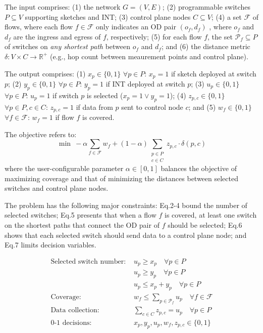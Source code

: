  The input comprises:
(1) the network $G = (V, E)$;
(2) programmable switches $P \subseteq V$ supporting sketches and INT;
(3) control plane nodes $C \subseteq V$;
(4) a set $\mathcal{F}$ of flows, where each flow $f \in \mathcal{F}$ only indicates an OD pair $(o_f, d_f)$ \cite{liu2016one,anup2022hetero}, where $o_f$ and $d_f$ are the ingress and egress of $f$, respectively; 
(5) for each flow $f$, the set $\mathcal{P}_f \subseteq P$ of switches on \emph{any shortest path} between $o_f$ and $d_f$;
and (6) the distance metric $\delta: V \times C \to \mathbb{R}^+$ (e.g., hop count between meaurement points and control plane).

 The output comprises:
(1) $x_p \in \{0,1\}$ $\forall p \in P$: $x_p=1$ if sketch deployed at switch $p$;
(2) $y_p \in \{0,1\}$ $\forall p \in P$: $y_p=1$ if INT deployed at switch $p$;
(3) $u_p \in \{0,1\}$ $\forall p \in P$: $u_p=1$ if switch $p$ is selected ($x_p =1 \lor y_p=1$);
(4) $z_{p,c} \in \{0,1\}$ $\forall p \in P, c \in C$: $z_{p,c}=1$ if data from $p$ sent to control node $c$;
and (5) $w_f \in \{0,1\}$ $\forall f \in \mathcal{F}$: $w_f=1$ if flow $f$ is covered.

 The objective refers to:
\begin{equation}
\min\ -\alpha \sum_{f \in \mathcal{F}} w_f + (1-\alpha) \sum_{\substack{p \in P \\ c \in C}} z_{p,c} \cdot \delta(p, c)
\label{eq:objective}
\end{equation}
where the user-configurable parameter $\alpha \in [0,1]$ balances the objective of maximizing coverage and that of minimizing the distances between selected switches and control plane nodes. 

 The problem has the following major constraints: Eq.2-4 bound the number of selected switches; Eq.5 presents that when a flow $f$ is covered, at least one switch on the shortest paths that connect the OD pair of $f$ should be selected; Eq.6 shows that each selected switch should send data to a control plane node; and Eq.7 limits decision variables. 

\vspace{-7pt}
{\footnotesize
\begin{align}
\text{Selected switch number: } &u_p \geq x_p \quad \forall p \in P \\
&u_p \geq y_p \quad \forall p \in P \\
&u_p \leq x_p + y_p \quad \forall p \in P \\
\text{Coverage: } &w_f \leq \sum_{p \in \mathcal{P}_f} u_p \quad \forall f \in \mathcal{F} \\
\text{Data collection: } &\sum_{c \in C} z_{p,c} = u_p \quad \forall p \in P \\
\text{0-1 decisions: } &x_p, y_p, u_p, w_f, z_{p,c} \in \{0,1\}
\end{align}}


